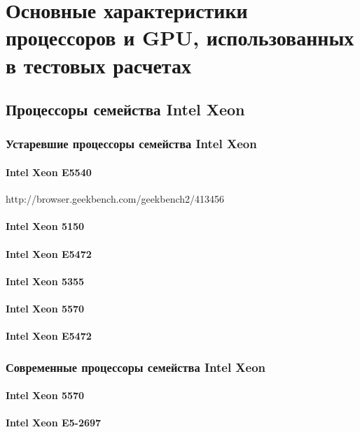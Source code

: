 \chapter{Основные характеристики процессоров и GPU, использованных в тестовых расчетах} \label{AppendixA}

\section{Процессоры семейства Intel Xeon}
\subsection{Устаревшие процессоры семейства Intel Xeon}
\subsubsection{Intel Xeon  E5540}
http://browser.geekbench.com/geekbench2/413456
\subsubsection{Intel Xeon 5150}
\subsubsection{Intel Xeon E5472}
\subsubsection{Intel Xeon 5355}
\subsubsection{Intel Xeon 5570}
\subsubsection{Intel Xeon E5472}


\subsection{Современные процессоры семейства Intel Xeon}
\subsubsection{Intel Xeon 5570}
\subsubsection{Intel Xeon E5-2697}

